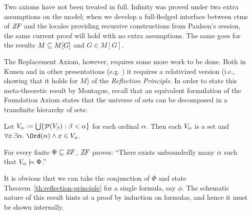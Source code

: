 

Two axioms have not been treated in full. Infinity was proved under
two extra assumptions on the model; when we develop a full-fledged
interface between ctms of $\mathit{ZF}$  and the locales 
providing recursive constructions from Paulson's
 session, the same current proof will hold
with no extra assumptions. The same goes for the results $M\subseteq M[G]$
and $G\in M[G]$. 

The Replacement Axiom, however, requires some more work to be
done. Both
in Kunen and in other presentations (e.g. \cite{neeman-course}) it
requires a relativized version (i.e., showing that it holds for $M$)
of the \emph{Reflection Principle}. In order to state this
meta-theoretic result by Montague, recall that an equivalent
formulation of the Foundation Axiom states that the universe of sets
can be decomposed in a transfinite hierarchy of sets:
\begin{theorem}
  Let $V_{\alpha}\mathrel{\mathop:}=\mathop{\textstyle\bigcup}\{\mathop{\mathcal{P}}(V_\beta) : \beta<\alpha\}$ for each ordinal
  $\alpha$. Then each $V_\alpha$ is a set and 
  $\forall x. \exists\al .\ \Ord(\al) \y x\in V_\al$.  
\end{theorem}
\begin{theorem}\label{th:reflection-principle}
  For every finite $\Phi\subseteq\mathit{ZF}$, $\mathit{ZF}$ proves: ``There exists
  unboundedly many $\alpha$ such that $V_\alpha\models \Phi$.''
\end{theorem}

It is obvious that we can take the conjunction of $\Phi$ and state
Theorem~\ref{th:reflection-principle} for a single formula, say $\phi$.
The schematic nature of this result
hints at a proof by induction on formulas, and hence it must be shown
internally. 

